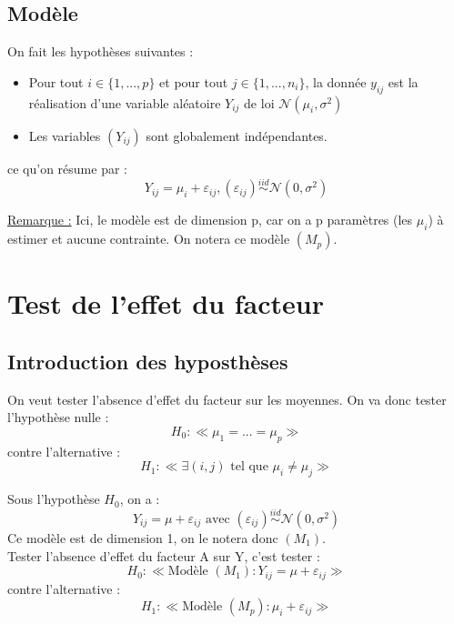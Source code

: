 \subsection{Modèle}
On fait les hypothèses suivantes :
\begin{itemize}
	\item Pour tout $i\in\{1,...,p\}$ et pour tout $j\in\{1,...,n_i\}$, la donnée $y_{ij}$ est la réalisation d'une variable aléatoire $Y_{ij}$ de loi $\mathcal{N}(\mu_i,\sigma^2)$
	\item Les variables $(Y_{ij})$ sont globalement indépendantes.
\end{itemize}
ce qu'on résume par :
	\[Y_{ij}=\mu_i+\varepsilon_{ij}, (\varepsilon_{ij})\overset{iid}{\sim}\mathcal{N}(0,\sigma^2)\]


\underline{Remarque :} Ici, le modèle est de dimension p, car on a p paramètres (les $\mu_i$) à estimer et aucune contrainte. On notera ce modèle $(M_p)$.

\section{Test de l'effet du facteur}
\subsection{Introduction des hyposthèses}
On veut tester l'absence d'effet du facteur sur les moyennes. On va donc tester l'hypothèse nulle :
	\[H_0:\ll\mu_1=...=\mu_p\gg\]
contre l'alternative :
	\[H_1:\ll\exists(i,j) \text{ tel que } \mu_i\neq \mu_j\gg\]

Sous l'hypothèse $H_0$, on a : \[Y_{ij}=\mu+\varepsilon_{ij} \text{ avec } (\varepsilon_{ij})\overset{iid}{\sim} \mathcal{N}(0,\sigma^2)\]
Ce modèle est de dimension 1, on le notera donc $(M_1)$.\\
Tester l'absence d'effet du facteur A sur Y, c'est tester :
	\[H_0:\ll\text{Modèle } (M_1) : Y_{ij}=\mu+\varepsilon_{ij} \gg\]
contre l'alternative :
	\[H_1:\ll\text{Modèle } (M_p) : \mu_i+\varepsilon_{ij} \gg\]

